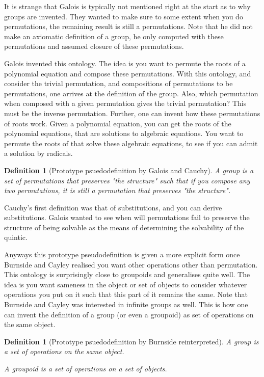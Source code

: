 \documentclass{tufte-book}
\newtheorem{definition}[theorem]{Definition}
\begin{document}
It is strange that Galois is typically not mentioned right at the start as to why groups are invented. They wanted to make sure to some extent when you do permutations, the remaining result is still a permutations. Note that he did not make an axiomatic definition of a group, he only computed with these permutations and assumed closure of these permutations.

Galois invented this ontology. The idea is you want to permute the roots of a polynomial equation and compose these permutations. With this ontology, and consider the trivial permutation, and compositions of permutations to be permutations, one arrives at the definition of the group. Also, which permutation when composed with a given permutation gives the trivial permutation? This must be the inverse permutation. Further, one can invent how these permutations of roots work. Given a polynomial equation, you can get the roots of the polynomial equations, that are solutions to algebraic equations. You want to permute the roots of that solve these algebraic equations, to see if you can admit a solution by radicals.

\begin{definition}[Prototype psuedodefinition by Galois and Cauchy]
A group is a set of permutations that preserves "the structure" such that if you compose any two permutations, it is still a permutation that preserves "the structure".
\end{definition}

Cauchy's first definition was that of substitutions, and you can derive substitutions. Galois wanted to see when will permutations fail to preserve the structure of being solvable as the means of determining the solvability of the quintic.

Anyways this prototype pseudodefinition is given a more explicit form once Burnside and Cayley realised you want other operations other than permutation. This ontology is surprisingly close to groupoids and generalises quite well. The idea is you want sameness in the object or set of objects to consider whatever operations you put on it such that this part of it remains the same. Note that Burnside and Cayley was interested in infinite groups as well. This is how one can invent the definition of a group (or even a groupoid) as set of operations on the same object.

\begin{definition}[Prototype psuedodefinition by Burnside reinterpreted]
A group is a set of operations on the same object.

A groupoid is a set of operations on a set of objects.
\end{definition}
\end{document}
